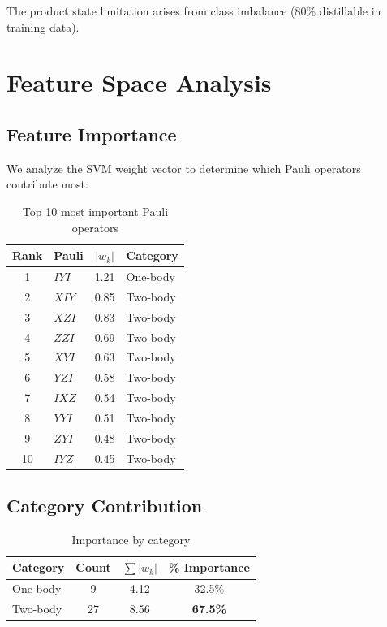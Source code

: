 \documentclass[11pt,a4paper]{article}
\begin{document}
The product state limitation arises from class imbalance (80\% distillable in training data).

\section{Feature Space Analysis}

\subsection{Feature Importance}

We analyze the SVM weight vector to determine which Pauli operators contribute most:

\begin{table}[h]
\centering
\caption{Top 10 most important Pauli operators}
\begin{tabular}{clcl}
\toprule
\textbf{Rank} & \textbf{Pauli} & \textbf{$|w_k|$} & \textbf{Category} \\
\midrule
1 & $IYI$ & 1.21 & One-body \\
2 & $XIY$ & 0.85 & Two-body \\
3 & $XZI$ & 0.83 & Two-body \\
4 & $ZZI$ & 0.69 & Two-body \\
5 & $XYI$ & 0.63 & Two-body \\
6 & $YZI$ & 0.58 & Two-body \\
7 & $IXZ$ & 0.54 & Two-body \\
8 & $YYI$ & 0.51 & Two-body \\
9 & $ZYI$ & 0.48 & Two-body \\
10 & $IYZ$ & 0.45 & Two-body \\
\bottomrule
\end{tabular}
\end{table}

\subsection{Category Contribution}

\begin{table}[h]
\centering
\caption{Importance by category}
\begin{tabular}{lccc}
\toprule
\textbf{Category} & \textbf{Count} & \textbf{$\sum |w_k|$} & \textbf{\% Importance} \\
\midrule
One-body & 9 & 4.12 & 32.5\% \\
Two-body & 27 & 8.56 & \textbf{67.5\%} \\
\bottomrule
\end{tabular}
\end{table}
\end{document}
